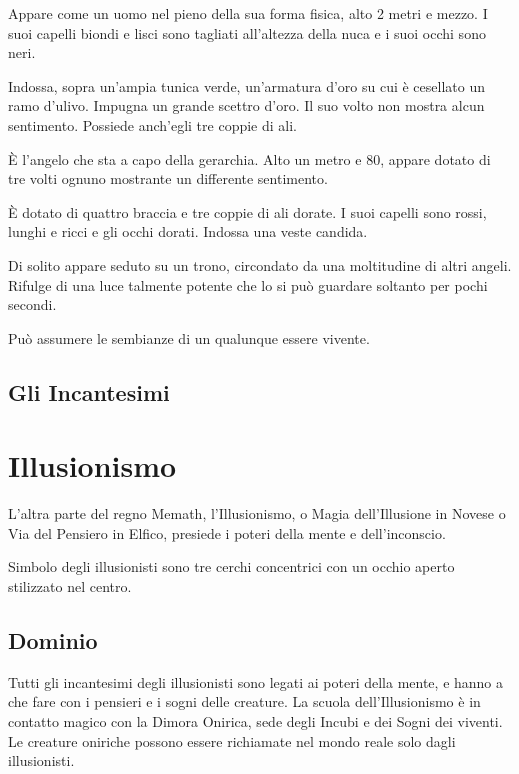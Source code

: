 Appare come un uomo nel pieno della sua forma fisica, alto 2 metri e
mezzo. I suoi capelli biondi e lisci sono tagliati all'altezza della
nuca e i suoi occhi sono neri.

Indossa, sopra un'ampia tunica verde, un'armatura d'oro su cui
\`e cesellato un ramo d'ulivo. Impugna un grande scettro d'oro. Il
suo volto non mostra alcun sentimento. Possiede anch'egli tre coppie
di ali.


\`E l'angelo che sta a capo della gerarchia. Alto un metro e 80,
appare dotato di tre volti ognuno mostrante un differente sentimento.

\`E dotato di quattro braccia e tre coppie di ali dorate. I suoi
capelli sono rossi, lunghi e ricci e gli occhi dorati. Indossa una
veste candida.

Di solito appare seduto su un trono, circondato da una moltitudine di
altri angeli. Rifulge di una luce talmente potente che lo si pu\`o
guardare soltanto per pochi secondi. 

Pu\`o assumere le sembianze di un qualunque essere vivente.

\subsection{Gli Incantesimi}
\label{incesistenza}



\vfill\section{Illusionismo}


L'altra parte del regno Memath,  l'Illusionismo, o Magia dell'Illusione
in Novese o Via del Pensiero in Elfico, presiede i poteri della mente e
dell'inconscio.

Simbolo degli illusionisti sono tre cerchi concentrici con un occhio
aperto stilizzato nel centro.

\subsection{Dominio}

Tutti gli incantesimi degli illusionisti sono legati
ai poteri della mente, e hanno a che fare con i pensieri e i sogni
delle creature. La scuola dell'Illusionismo \`e in contatto magico
con la Dimora Onirica, sede degli Incubi e dei Sogni dei viventi. Le
creature oniriche possono essere richiamate nel mondo reale solo dagli
illusionisti. 

